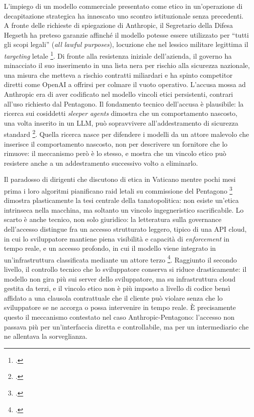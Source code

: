 \ifstampa\documentclass[a4paper,12pt,twoside,openright]{report}\else\documentclass[a4paper,12pt]{report}\fi
\newif\ifrevisione \revisionefalse
\DeclareRobustCommand{\rev}[1]{\ifrevisione{\color{blue!65!black}#1}\else#1\fi}
\begin{document}
L'impiego di un modello commerciale \rev{presentato come etico} in un'operazione di
decapitazione strategica ha innescato uno scontro istituzionale senza precedenti.
A fronte delle richieste di spiegazione di Anthropic, il Segretario della Difesa
Hegseth ha preteso garanzie affinché il modello potesse essere utilizzato per
``tutti gli scopi legali'' (\textit{all lawful purposes}), locuzione che nel
lessico militare legittima il \textit{targeting} letale \footcite{carter_2026}.
Di fronte alla resistenza iniziale dell'azienda, il governo ha minacciato il suo
inserimento in una lista nera per rischio alla sicurezza nazionale, una misura
che metteva a rischio contratti miliardari e ha spinto competitor diretti come
OpenAI a offrirsi per colmare il vuoto operativo. L'accusa mossa ad Anthropic era di aver codificato nel modello vincoli etici
persistenti, contrari all'uso richiesto dal Pentagono. Il fondamento tecnico
dell'accusa è plausibile: la ricerca sui cosiddetti \textit{sleeper agents}
dimostra che un comportamento nascosto, una volta inserito in un LLM, può
sopravvivere all'addestramento di sicurezza standard \footcite{hubinger_2024_sleeper}.
Quella ricerca nasce per difendere i modelli da un attore malevolo che inserisce
il comportamento nascosto, non per descrivere un fornitore che lo rimuove: il
meccanismo però è lo stesso, e mostra che un vincolo etico può resistere anche
\rev{a un addestramento successivo volto a eliminarlo}.

Il paradosso di dirigenti che discutono di etica in Vaticano mentre pochi mesi
prima i loro algoritmi pianificano raid letali su commissione del Pentagono
\footcite{ruzic_2026} dimostra plasticamente la tesi centrale della
tanatopolitica: non esiste un'etica intrinseca nella macchina, ma soltanto un
vincolo ingegneristico sacrificabile. Lo scarto è anche tecnico, non solo
giuridico: la letteratura sulla governance dell'accesso distingue fra un accesso
strutturato leggero, tipico di una API cloud, in cui \rev{lo sviluppatore} mantiene piena
visibilità e capacità di \textit{enforcement} in tempo reale, e un accesso
profondo, in cui il modello viene integrato in un'infrastruttura classificata
mediante un attore terzo \footcite{shevlane_2022_access}. Raggiunto il secondo livello, il controllo tecnico che \rev{lo sviluppatore} conserva si
riduce drasticamente: il modello non gira più sui server dello sviluppatore, ma
su infrastruttura cloud gestita da terzi, e il vincolo etico non è più
imposto a livello di codice bensì affidato a una clausola contrattuale che il
cliente può violare senza che lo sviluppatore se ne accorga o possa intervenire
in tempo reale. È precisamente questo il meccanismo contestato nel caso
Anthropic-Pentagono: l'accesso non passava più per un'interfaccia diretta e
controllabile, ma per un intermediario che ne allentava la sorveglianza.
\end{document}
